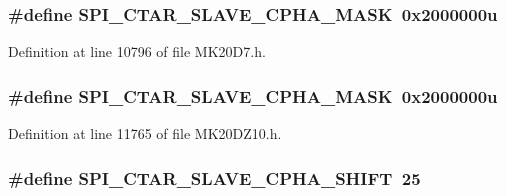 \subsubsection[{\texorpdfstring{S\+P\+I\+\_\+\+C\+T\+A\+R\+\_\+\+S\+L\+A\+V\+E\+\_\+\+C\+P\+H\+A\+\_\+\+M\+A\+SK}{SPI_CTAR_SLAVE_CPHA_MASK}}]{\setlength{\rightskip}{0pt plus 5cm}\#define S\+P\+I\+\_\+\+C\+T\+A\+R\+\_\+\+S\+L\+A\+V\+E\+\_\+\+C\+P\+H\+A\+\_\+\+M\+A\+SK~0x2000000u}\hypertarget{group___s_p_i___register___masks_ga3e8aa9f143abc35fcb9f86e5de378621}{}\label{group___s_p_i___register___masks_ga3e8aa9f143abc35fcb9f86e5de378621}


Definition at line 10796 of file M\+K20\+D7.\+h.

\subsubsection[{\texorpdfstring{S\+P\+I\+\_\+\+C\+T\+A\+R\+\_\+\+S\+L\+A\+V\+E\+\_\+\+C\+P\+H\+A\+\_\+\+M\+A\+SK}{SPI_CTAR_SLAVE_CPHA_MASK}}]{\setlength{\rightskip}{0pt plus 5cm}\#define S\+P\+I\+\_\+\+C\+T\+A\+R\+\_\+\+S\+L\+A\+V\+E\+\_\+\+C\+P\+H\+A\+\_\+\+M\+A\+SK~0x2000000u}\hypertarget{group___s_p_i___register___masks_ga3e8aa9f143abc35fcb9f86e5de378621}{}\label{group___s_p_i___register___masks_ga3e8aa9f143abc35fcb9f86e5de378621}


Definition at line 11765 of file M\+K20\+D\+Z10.\+h.

\subsubsection[{\texorpdfstring{S\+P\+I\+\_\+\+C\+T\+A\+R\+\_\+\+S\+L\+A\+V\+E\+\_\+\+C\+P\+H\+A\+\_\+\+S\+H\+I\+FT}{SPI_CTAR_SLAVE_CPHA_SHIFT}}]{\setlength{\rightskip}{0pt plus 5cm}\#define S\+P\+I\+\_\+\+C\+T\+A\+R\+\_\+\+S\+L\+A\+V\+E\+\_\+\+C\+P\+H\+A\+\_\+\+S\+H\+I\+FT~25}\hypertarget{group___s_p_i___register___masks_ga6470631f0d2f0d7722ab55a1f97c936e}{}\label{group___s_p_i___register___masks_ga6470631f0d2f0d7722ab55a1f97c936e}


